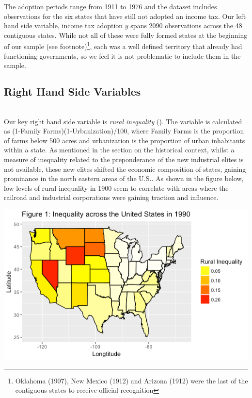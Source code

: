 \documentclass[letter, 12pt]{article}
\begin{document}
The adoption periods range from 1911 to 1976 and the dataset includes observations for the six states that have still not adopted an income tax. Our left hand side variable, income tax adoption $y$ spans 2090 observations across the 48 contiguous states. While not all of these were fully formed states at the beginning of our sample (see footnote)\footnote{Oklahoma (1907), New Mexico (1912) and Arizona (1912) were the last of the contiguous states to receive official recognition}, each was a well defined territory that already had functioning governments, so we feel it is not problematic to include them in the sample.  

\subsection{Right Hand Side Variables}\hfill\\

Our key right hand side variable is \emph{rural inequality} (\citealt{ansell2014inequality}). The variable is calculated as (1-Family Farms)(1-Urbanization)/100, where Family Farms is the proportion of farms below 500 acres and urbanization is the proportion of urban inhabitants within a state. As mentioned in the section on the historical context, whilst a measure of inequality related to the preponderance of the new industrial elites is not available, these new elites shifted the economic composition of states, gaining prominance in the north eastern areas of the U.S.. As shown in the figure below, low levels of rural inequality in 1900 seem to correlate with areas where the railroad and industrial corporations were gaining traction and influence. 

\includegraphics[scale=0.70]{ps745-figure3}
\end{document}
